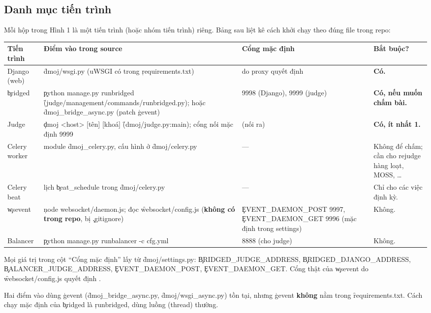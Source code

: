 \subsection{Danh mục tiến trình}
Mỗi hộp trong Hình 1 là một tiến trình (hoặc nhóm tiến trình) riêng. Bảng sau liệt kê cách khởi chạy theo đúng file trong repo:
\begin{center}\small
\begin{tabularx}{\textwidth}{@{}L{2.5cm}L{4.4cm}L{2.7cm}Y@{}}
\toprule
Tiến trình & Điểm vào trong source & Cổng mặc định & Bắt buộc? \\
\midrule
Django (web) & \f{dmoj/wsgi.py} (uWSGI có trong \c{requirements.txt}) & do proxy quyết định & \textbf{Có.} \\
\c{bridged} & \c{python manage.py runbridged} \f{(judge/management/commands/runbridged.py)}; hoặc \f{dmoj_bridge_async.py} (patch \c{gevent}) & 9998 (Django), 9999 (judge) & \textbf{Có, nếu muốn chấm bài.} \\
Judge & \c{dmoj <host> [tên] [khoá]} \f{(dmoj/judge.py:main)}; cổng nối mặc định 9999 & (nối ra) & \textbf{Có, ít nhất 1.} \\
Celery worker & module \f{dmoj_celery.py}, cấu hình ở \f{dmoj/celery.py} & --- & Không để chấm; cần cho rejudge hàng loạt, MOSS, \ldots \\
Celery beat & lịch \c{beat_schedule} trong \f{dmoj/celery.py} & --- & Chỉ cho các việc định kỳ. \\
\c{wsevent} & \c{node websocket/daemon.js}; đọc \f{websocket/config.js} (\textbf{không có trong repo}, bị \c{.gitignore}) & \c{EVENT_DAEMON_POST} 9997, \c{EVENT_DAEMON_GET} 9996 (mặc định trong settings) & Không. \\
Balancer & \c{python manage.py runbalancer -c cfg.yml} & 8888 (cho judge) & Không. \\
\bottomrule
\end{tabularx}
\end{center}
\tS Mọi giá trị trong cột ``Cổng mặc định'' lấy từ \f{dmoj/settings.py}: \c{BRIDGED_JUDGE_ADDRESS}, \c{BRIDGED_DJANGO_ADDRESS}, \c{BALANCER_JUDGE_ADDRESS}, \c{EVENT_DAEMON_POST}, \c{EVENT_DAEMON_GET}. Cổng thật của \c{wsevent} do \f{websocket/config.js} quyết định \tQ.

Hai điểm vào dùng \c{gevent} (\f{dmoj_bridge_async.py}, \f{dmoj/wsgi_async.py}) tồn tại, nhưng \c{gevent} \textbf{không} nằm trong \f{requirements.txt}. Cách chạy mặc định của \c{bridged} là \c{runbridged}, dùng luồng (thread) thường. \tS

